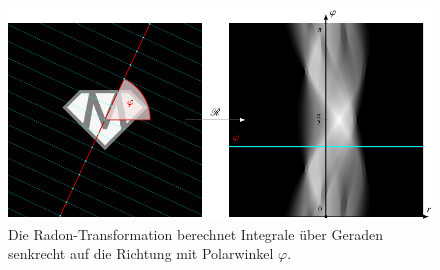 %
%
%
\begin{figure}
\centering
\includegraphics[width=\textwidth]{chapters/050-radon/images/radon.pdf}
\caption{Die Radon-Transformation berechnet Integrale über Geraden
senkrecht auf die Richtung mit Polarwinkel $\varphi$.
\label{buch:radon:definition:fig:radon}}
\end{figure}
